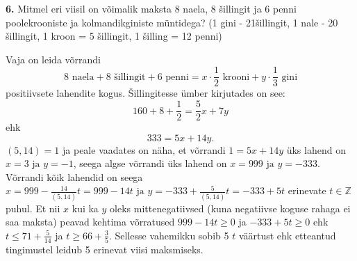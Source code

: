 \documentclass[a4paper, 10pt]{article}
\begin{document}
\noindent\textbf{6.} Mitmel eri viisil on võimalik maksta 8 naela, 8 šillingit ja 6 penni poolekrooniste ja kolmandikginiste müntidega? (1 gini - 21šillingit, 1 nale - 20 šillingit, 1 kroon = 5 šillingit, 1 šilling = 12 penni)

\bigskip
Vaja on leida võrrandi $$8\text{ naela} + 8\text{ šillingit}+6\text{ penni}=x\cdot\frac12\text{ krooni}+y\cdot\frac13\text{ gini}$$ positiivsete lahendite kogus. Šillingitesse ümber kirjutades on see: $$160+8+\frac12=\frac52x+7y$$ ehk $$333=5x+14y.$$ $(5,14)=1$ ja peale vaadates on näha, et võrrandi $1=5x+14y$ üks lahend on $x=3\text{ ja }y=-1$, seega algse võrrandi üks lahend on $x=999\text{ ja }y=-333$. Võrrandi kõik lahendid on seega $x=999-\frac{14}{(5,14)}t=999-14t\text{ ja }y=-333+\frac{5}{(5,14)}t=-333+5t$ erinevate $t\in\mathbb{Z}$ puhul. Et nii $x$ kui ka $y$ oleks mittenegatiivsed (kuna negatiivse koguse rahaga ei saa maksta) peavad kehtima võrratused $999-14t\geq0$ ja $-333+5t\geq0$ ehk $t\leq71+\frac5{14}$ ja $t\geq 66+\frac35$. Sellesse vahemikku sobib 5 $t$ väärtust ehk etteantud tingimustel leidub 5 erinevat viisi maksmiseks.
\bigskip
\end{document}
